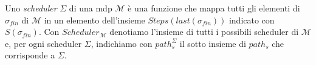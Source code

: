 \begin{mtdef}[Scheduler]
	Uno \emph{scheduler} $\Sigma$ di una \ac{mdp} $\mathcal{M}$ è una funzione che mappa tutti gli elementi di $\sigma_{fin}$ di $\mathcal{M}$ in un elemento dell'insieme $Steps(last(\sigma_{fin}))$ indicato con $S(\sigma_{fin})$. Con $Scheduler_{\mathcal{M}}$ denotiamo l'insieme di tutti i possibili scheduler di $\mathcal{M}$ e, per ogni scheduler $\Sigma$, indichiamo con $path_s^\Sigma$ il sotto insieme di $path_s$ che corrisponde a $\Sigma$.
\end{mtdef}


